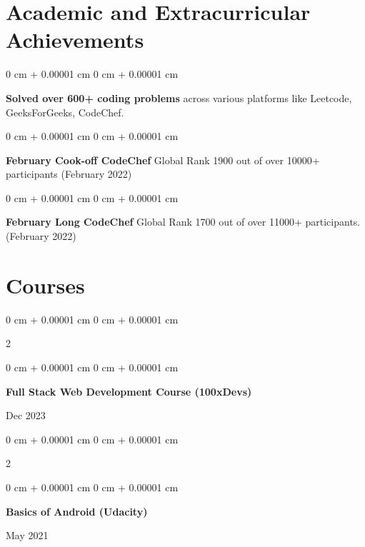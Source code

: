 \documentclass[9pt, letterpaper]{article}
\newenvironment{onecolentry}{
    \begin{adjustwidth}{
        0 cm + 0.00001 cm
    }{
        0 cm + 0.00001 cm
    }
}{
    \end{adjustwidth}
}
\newenvironment{twocolentry}[2][]{
    \onecolentry
    \def\secondColumn{#2}
    \setcolumnwidth{\fill, 4 cm}
    \begin{paracol}{2}
}{
    \switchcolumn \raggedleft \secondColumn
    \end{paracol}
    \endonecolentry
}
\begin{document}
    \vspace{0.2cm}
    \section{\textbf{Academic and Extracurricular Achievements}}

        \begin{onecolentry}
            \textbf{Solved over 600+ coding problems} across various platforms like Leetcode, GeeksForGeeks, CodeChef.
        \end{onecolentry}

        \vspace{0.05 cm}

        \begin{onecolentry}
            \textbf{February Cook-off CodeChef} Global Rank 1900 out of over 10000+ participants (February 2022)
        \end{onecolentry}

        \vspace{0.05cm}
        \begin{onecolentry}
            \textbf{February Long CodeChef} Global Rank 1700 out of over 11000+ participants. (February 2022)
        \end{onecolentry}

        \vspace{0.2cm}
        \section{\textbf{Courses}}
        \begin{twocolentry}{Dec 2023}
            \begin{onecolentry}
                \textbf{Full Stack Web Development Course (100xDevs)}
            \end{onecolentry}
        \end{twocolentry}
        \begin{twocolentry}{May 2021}
            \begin{onecolentry}
                \textbf{Basics of Android (Udacity)}
            \end{onecolentry}
        \end{twocolentry}
            
        
\end{document}
